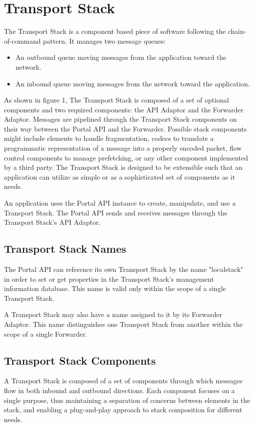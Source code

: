 \section{Transport Stack}
The Transport Stack is a component based piece of software following the chain-of-command pattern. It manages two message queues: 
\begin{itemize}
\item An outbound queue moving messages from the application toward the network.
\item An inbound queue moving messages from the network toward the application.
\end{itemize}

As shown in figure 1, The Transport Stack is composed of a set of optional components and two required components: the API Adaptor and the Forwarder Adaptor.  Messages are pipelined through the Transport Stack components on their way between the Portal API and the Forwarder.  Possible stack components might include elements to handle fragmentation, codecs to translate a programmatic representation of a message into a properly encoded packet, flow control components to manage prefetching, or any other component implemented by a third party.  The Transport Stack is designed to be extensible such that an application can utilize as simple or as a sophisticated set of components as it needs.

An application uses the Portal API instance to create, manipulate, and use a Transport Stack.
The Portal API sends and receives messages through the Transport Stack's API Adaptor.

\subsection{Transport Stack Names}
The Portal API can reference its own Transport Stack by the name "localstack" in order to set or get properties in the Transport Stack's management information database. This name is valid only within the scope of a single Transport Stack.

A Transport Stack may also have a name assigned to it by its Forwarder Adaptor.
This name distinguishes one Transport Stack from another within the scope of a single Forwarder.

\subsection{Transport Stack Components}
A Transport Stack is composed of a set of components through which messages flow in both inbound and outbound directions.
Each component focuses on a single purpose, thus maintaining a separation of concerns between elements in the stack, and enabling a 
plug-and-play approach to stack composition for different needs.

